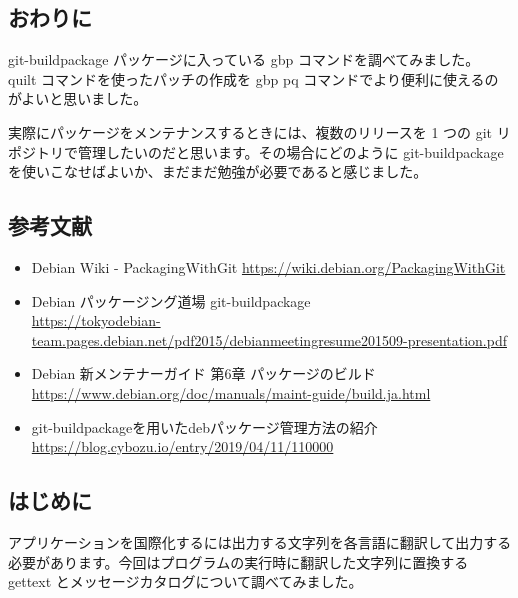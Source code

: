 \documentclass[mingoth,a4paper]{jsarticle}
\begin{document}
\subsection{おわりに}

git-buildpackage パッケージに入っている gbp コマンドを調べてみました。
quilt コマンドを使ったパッチの作成を gbp pq コマンドでより便利に使えるのがよいと思いました。

実際にパッケージをメンテナンスするときには、複数のリリースを 1 つの git リポジトリで管理したいのだと思います。その場合にどのように git-buildpackage を使いこなせばよいか、まだまだ勉強が必要であると感じました。


\subsection{参考文献}

\begin{itemize}
  \item Debian Wiki - PackagingWithGit \url{https://wiki.debian.org/PackagingWithGit}
  \item Debian パッケージング道場 git-buildpackage\\ \url{https://tokyodebian-team.pages.debian.net/pdf2015/debianmeetingresume201509-presentation.pdf}
  \item Debian 新メンテナーガイド 第6章 パッケージのビルド \\ \url{https://www.debian.org/doc/manuals/maint-guide/build.ja.html}
  \item git-buildpackageを用いたdebパッケージ管理方法の紹介 \\ \url{https://blog.cybozu.io/entry/2019/04/11/110000}
\end{itemize}
%

\subsection{はじめに}

アプリケーションを国際化するには出力する文字列を各言語に翻訳して出力する必要があります。今回はプログラムの実行時に翻訳した文字列に置換する gettext とメッセージカタログについて調べてみました。
\end{document}
